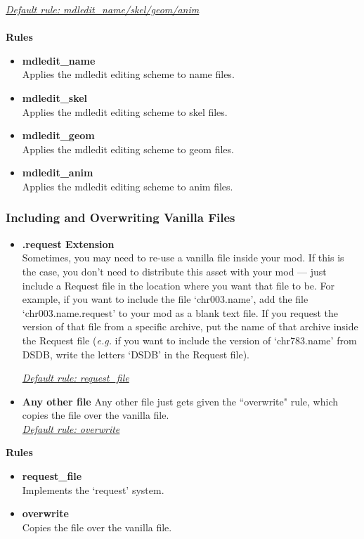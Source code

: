 \documentclass{article}
\begin{document}
\underline{\textit{Default rule: mdledit\_name/skel/geom/anim}}\\\\
\textbf{Rules}
\begin{itemize}
\item \textbf{mdledit\_name}\\
Applies the mdledit editing scheme to name files.
\item \textbf{mdledit\_skel}\\
Applies the mdledit editing scheme to skel files.
\item \textbf{mdledit\_geom}\\
Applies the mdledit editing scheme to geom files.
\item \textbf{mdledit\_anim}\\
Applies the mdledit editing scheme to anim files.
\end{itemize}

\subsubsection{Including and Overwriting Vanilla Files}
\begin{itemize}
\item \textbf{.request Extension}\\
Sometimes, you may need to re-use a vanilla file inside your mod. If this is the case, you don't need to distribute this asset with your mod --- just include a Request file in the location where you want that file to be. For example, if you want to include the file `chr003.name', add the file `chr003.name.request' to your mod as a blank text file. If you request the version of that file from a specific archive, put the name of that archive inside the Request file (\textit{e.g.} if you want to include the version of `chr783.name' from DSDB, write the letters `DSDB' in the Request file).

\underline{\textit{Default rule: request\_file}}
\item \textbf{Any other file}
Any other file just gets given the ``overwrite" rule, which copies the file over the vanilla file.\\
\underline{\textit{Default rule: overwrite}}
\end{itemize}
\textbf{Rules}
\begin{itemize}
	\item \textbf{request\_file}\\
	Implements the `request' system.
	\item \textbf{overwrite}\\
	Copies the file over the vanilla file.
\end{itemize}
\end{document}
